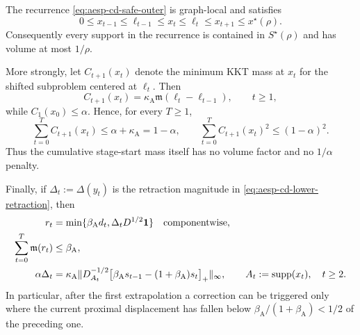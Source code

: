 \begin{theorem}
\label{thm:aesp-cd-safe-outer-ledger}
The recurrence \cref{eq:aesp-cd-safe-outer} is graph-local and satisfies
\begin{equation}
 0\leq x_{t-1}\leq\ell_{t-1}\leq x_t\leq\ell_t
 \leq x_{t+1}\leq x^\star(\rho).
 \label{eq:aesp-cd-safe-chain}
\end{equation}
Consequently every support in the recurrence is contained in
$S^\star(\rho)$ and has volume at most $1/\rho$.

More strongly, let $C_{t+1}(x_t)$ denote the minimum KKT mass at $x_t$ for
the shifted subproblem centered at $\ell_t$.  Then
\begin{equation}
 C_{t+1}(x_t)
 =\kappa_{\mathrm A}\mathfrak m(\ell_t-\ell_{t-1}),
 \qquad t\geq1,
 \label{eq:aesp-cd-safe-start-exact}
\end{equation}
while $C_1(x_0)\leq\alpha$.  Hence, for every $T\geq1$,
\begin{equation}
 \sum_{t=0}^T C_{t+1}(x_t)
 \leq\alpha+\kappa_{\mathrm A}=1-\alpha,
 \qquad
 \sum_{t=0}^T C_{t+1}(x_t)^2\leq(1-\alpha)^2.
 \label{eq:aesp-cd-safe-start-ledger}
\end{equation}
Thus the cumulative stage-start mass itself has no volume factor and no
$1/\alpha$ penalty.

Finally, if $\Delta_t:=\Delta(y_t)$ is the retraction magnitude in
\cref{eq:aesp-cd-lower-retraction}, then
\begin{align}
 r_t
 &=\min\{\beta_{\mathrm A}d_t,\Delta_tD^{1/2}\mathbf{1}\}
 \quad\text{componentwise},
 \label{eq:aesp-cd-safe-correction}\\
 \sum_{t=0}^T \mathfrak m(r_t)&\leq\beta_{\mathrm A},
 \label{eq:aesp-cd-safe-correction-ledger}\\
 \alpha\Delta_t
 &=\kappa_{\mathrm A}
 \lVert D_{A_t}^{-1/2}
 \bigl[\beta_{\mathrm A}s_{t-1}
       -(1+\beta_{\mathrm A})s_t\bigr]_+\rVert_\infty,
 \qquad A_t:=\operatorname{supp}(x_t),\quad t\geq2.
 \label{eq:aesp-cd-safe-collapse}
\end{align}
In particular, after the first extrapolation a correction can be triggered
only where the current proximal displacement has fallen below
$\beta_{\mathrm A}/(1+\beta_{\mathrm A})<1/2$ of the preceding one.
\end{theorem}


